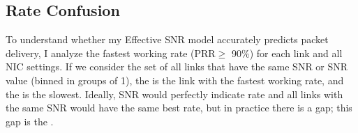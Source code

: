 %	
%
%

\subsection{Rate Confusion}
\label{sec:rate_confusion}

To understand whether my Effective SNR model accurately predicts packet delivery, I analyze the fastest working rate (PRR$\geq$ 90\%) for each link and all NIC settings. If we consider the set of all links that have the same SNR or SNR value (binned in groups of 1\dB), the  is the link with the fastest working rate, and the  is the slowest. Ideally, SNR would perfectly indicate rate and all links with the same SNR would have the same best rate, but in practice there is a gap; this gap is the .

